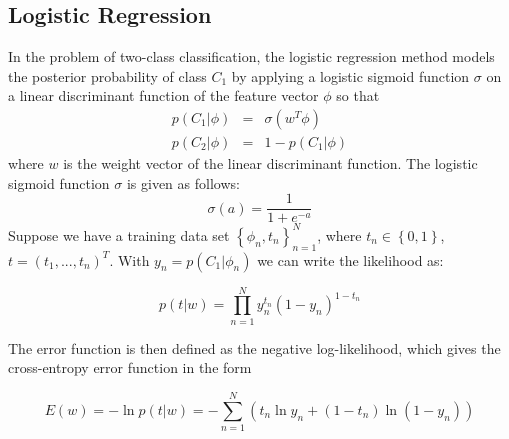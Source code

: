 \documentclass{SMBV13}
\begin{document}
\subsection{Logistic Regression}
\label{sec:logistic_regression}
In the problem of two-class classification, the logistic regression method models the posterior probability of class $C_1$ by applying a logistic sigmoid function $\sigma$ on a linear discriminant function of the feature vector $\phi$ so that
\begin{equation}
\label{eq:logistic}
\begin{array}{lcl}
	p(C_1|\phi) & = & \sigma(w^T\phi) \\
	p(C_2|\phi) & = & 1 - p(C_1|\phi) 
\end{array}
\end{equation}
where $w$ is the weight vector of the linear discriminant function. The logistic sigmoid function $\sigma$ is given as follows:
\begin{equation}
\label{eq:Bayes}
\sigma(a) = \dfrac{1}{1 + e^{-a}} 
\end{equation}
Suppose we have a training data set $\left\lbrace \phi_n, t_n \right\rbrace_{n = 1}^N$, where $t_n \in \left\lbrace 0, 1 \right\rbrace$, $t = (t_1, ..., t_n)^T$. With $y_n = p(C_1|\phi_n)$ we can write the likelihood as:

\begin{equation}
p(t|w) = \prod\limits_{n = 1}^{N}y_n^{t_n} (1 - y_n)^{1 - t_n}
\end{equation}

The error function is then defined as the negative log-likelihood, which gives the cross-entropy error function in the form

\begin{equation}
E(w) = - \ln p(t|w) = - \sum\limits_{n = 1}^{N} \left( t_n \ln y_n + (1 - t_n) \ln(1 - y_n) \right)
\end{equation}
\end{document}

